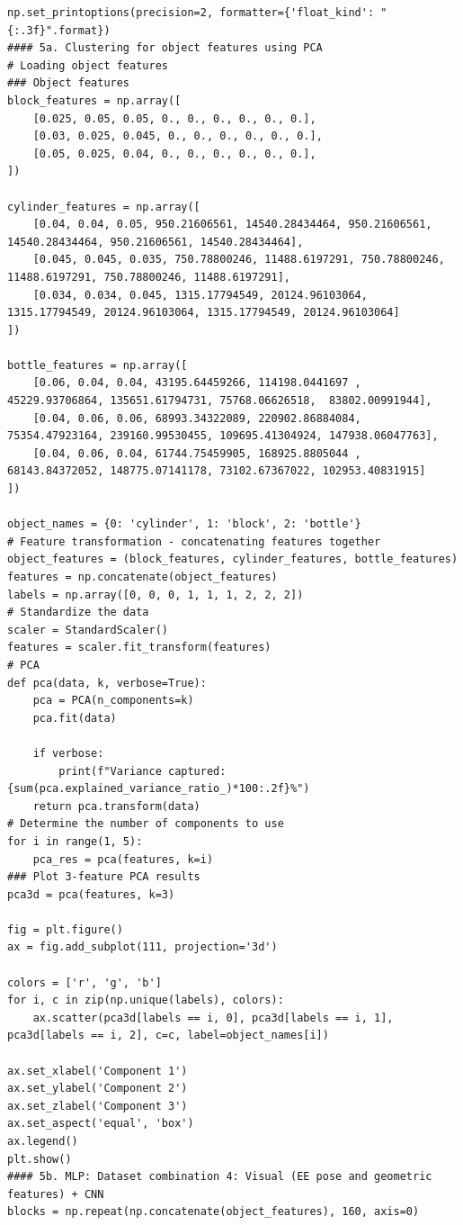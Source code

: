 \documentclass[11pt, a4paper]{report}
\begin{document}
\begin{lstlisting}
np.set_printoptions(precision=2, formatter={'float_kind': "{:.3f}".format})
#### 5a. Clustering for object features using PCA
# Loading object features
### Object features
block_features = np.array([
    [0.025, 0.05, 0.05, 0., 0., 0., 0., 0., 0.],
    [0.03, 0.025, 0.045, 0., 0., 0., 0., 0., 0.],
    [0.05, 0.025, 0.04, 0., 0., 0., 0., 0., 0.],
])

cylinder_features = np.array([
    [0.04, 0.04, 0.05, 950.21606561, 14540.28434464, 950.21606561, 14540.28434464, 950.21606561, 14540.28434464],
    [0.045, 0.045, 0.035, 750.78800246, 11488.6197291, 750.78800246, 11488.6197291, 750.78800246, 11488.6197291],
    [0.034, 0.034, 0.045, 1315.17794549, 20124.96103064, 1315.17794549, 20124.96103064, 1315.17794549, 20124.96103064]
])

bottle_features = np.array([
    [0.06, 0.04, 0.04, 43195.64459266, 114198.0441697 , 45229.93706864, 135651.61794731, 75768.06626518,  83802.00991944],
    [0.04, 0.06, 0.06, 68993.34322089, 220902.86884084, 75354.47923164, 239160.99530455, 109695.41304924, 147938.06047763],
    [0.04, 0.06, 0.04, 61744.75459905, 168925.8805044 , 68143.84372052, 148775.07141178, 73102.67367022, 102953.40831915]
])

object_names = {0: 'cylinder', 1: 'block', 2: 'bottle'}
# Feature transformation - concatenating features together
object_features = (block_features, cylinder_features, bottle_features)
features = np.concatenate(object_features)
labels = np.array([0, 0, 0, 1, 1, 1, 2, 2, 2])
# Standardize the data
scaler = StandardScaler()
features = scaler.fit_transform(features)
# PCA
def pca(data, k, verbose=True):
    pca = PCA(n_components=k)
    pca.fit(data)

    if verbose:
        print(f"Variance captured: {sum(pca.explained_variance_ratio_)*100:.2f}%")
    return pca.transform(data)
# Determine the number of components to use
for i in range(1, 5):
    pca_res = pca(features, k=i)
### Plot 3-feature PCA results
pca3d = pca(features, k=3)

fig = plt.figure()
ax = fig.add_subplot(111, projection='3d')

colors = ['r', 'g', 'b']
for i, c in zip(np.unique(labels), colors):
    ax.scatter(pca3d[labels == i, 0], pca3d[labels == i, 1], pca3d[labels == i, 2], c=c, label=object_names[i])

ax.set_xlabel('Component 1')
ax.set_ylabel('Component 2')
ax.set_zlabel('Component 3')
ax.set_aspect('equal', 'box')
ax.legend()
plt.show()
#### 5b. MLP: Dataset combination 4: Visual (EE pose and geometric features) + CNN
blocks = np.repeat(np.concatenate(object_features), 160, axis=0)


\end{lstlisting}
\end{document}
